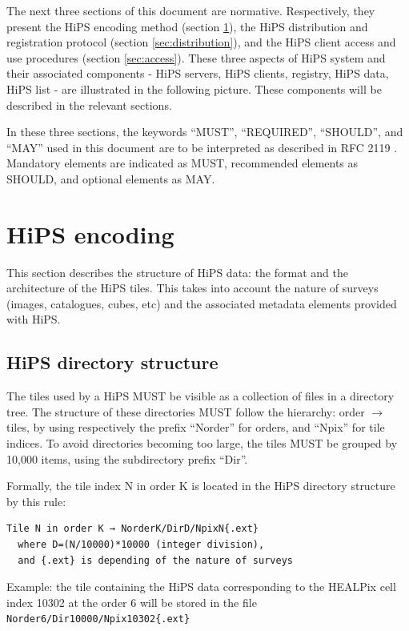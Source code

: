 \documentclass[11pt,a4paper]{ivoa}
\begin{document}
The next three sections of this document are normative. Respectively, they present the HiPS encoding method (section \ref{sec:encoding}), the HiPS distribution and registration protocol (section \ref{sec:distribution}), and the HiPS client access and use procedures (section \ref{sec:access}). These three aspects of HiPS system and their associated components - HiPS servers, HiPS clients, registry, HiPS data, HiPS list - are illustrated in the following picture. These components will be described in the relevant sections.

In these three sections, the keywords ``MUST'', ``REQUIRED'', ``SHOULD'', and ``MAY'' used in this document are to be interpreted as described in RFC 2119 \citep{std:RFC2119}. Mandatory elements are indicated as MUST, recommended elements as SHOULD, and optional elements as MAY.

\section{HiPS encoding}
\label{sec:encoding}

This section describes the structure of HiPS data: the format and the architecture of the HiPS tiles. This takes into account the nature of surveys (images, catalogues, cubes, etc) and the associated metadata elements provided with HiPS.

\subsection{HiPS directory structure}

The tiles used by a HiPS MUST be visible as a collection of files in a directory tree. The structure of these directories MUST follow the hierarchy: order $\rightarrow$ tiles, by using respectively the prefix ``Norder'' for orders, and ``Npix'' for tile indices. To avoid directories becoming too large, the tiles MUST be grouped by 10,000 items, using the subdirectory prefix ``Dir''. 

Formally, the tile index N in order K is located in the HiPS directory structure by this rule: 

\begin{verbatim}
Tile N in order K → NorderK/DirD/NpixN{.ext}
  where D=(N/10000)*10000 (integer division),
  and {.ext} is depending of the nature of surveys
\end{verbatim}

Example: the tile containing the HiPS data corresponding to the HEALPix cell index 10302 at the order 6 will be stored in the file \texttt{Norder6/Dir10000/Npix10302\{.ext\}}
\end{document}
